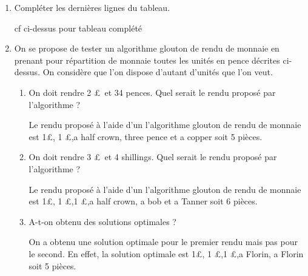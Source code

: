 \documentclass[12pt,french]{article}
\begin{document}
\begin{enumerate}
	\item Compléter les dernières lignes du tableau.
		\begin{tcolorbox}[enhanced,attach boxed title to top center={yshift=-3mm,yshifttext=-1mm},
		colback=blue!5!white,colframe=blue!75!black,colbacktitle=blue!25!black,
		title=solution :, fonttitle=\bfseries,
		boxed title style={size=small,colframe=green!25!black} ]
	cf ci-dessus pour tableau complété
\end{tcolorbox} 

	\item On se propose de tester un algorithme glouton de rendu de monnaie en prenant pour répartition de monnaie toutes les unités en pence décrites ci-dessus. On considère que l'on dispose d'autant d'unités que l'on veut.
		\begin{enumerate} 
		\item On doit rendre 2 \pounds\, et 34 pences. Quel serait le rendu proposé par l'algorithme ?	
		\begin{tcolorbox}[enhanced,attach boxed title to top center={yshift=-3mm,yshifttext=-1mm},
			colback=blue!5!white,colframe=blue!75!black,colbacktitle=blue!25!black,
			title=solution :, fonttitle=\bfseries,
			boxed title style={size=small,colframe=green!25!black} ]
		Le rendu proposé à l'aide d'un l'algorithme glouton de rendu de monnaie est 1\pounds , 1 \pounds,a half crown, three pence et a copper  soit 5 pièces.
	\end{tcolorbox} 		
		\item On doit rendre 3 \pounds\, et 4 shillings. Quel serait le rendu proposé par l'algorithme ?
		\begin{tcolorbox}[enhanced,attach boxed title to top center={yshift=-3mm,yshifttext=-1mm},
			colback=blue!5!white,colframe=blue!75!black,colbacktitle=blue!25!black,
			title=solution :, fonttitle=\bfseries,
			boxed title style={size=small,colframe=green!25!black} ]
		Le rendu proposé à l'aide d'un l'algorithme glouton de rendu de monnaie est 1\pounds , 1 \pounds,1 \pounds,a half crown, a bob et a Tanner  soit 6 pièces.
	\end{tcolorbox} 		 
		\item A-t-on obtenu des solutions optimales ? 
	\begin{tcolorbox}[enhanced,attach boxed title to top center={yshift=-3mm,yshifttext=-1mm},
		colback=blue!5!white,colframe=blue!75!black,colbacktitle=blue!25!black,
		title=solution :, fonttitle=\bfseries,
		boxed title style={size=small,colframe=green!25!black} ]
		On a obtenu une solution optimale pour le premier rendu mais pas pour le second. En effet, la solution optimale est 1\pounds , 1 \pounds,1 \pounds,a Florin, a Florin soit 5 pièces.
	\end{tcolorbox} 
		\end{enumerate}
  
\end{enumerate} 
\end{document}
